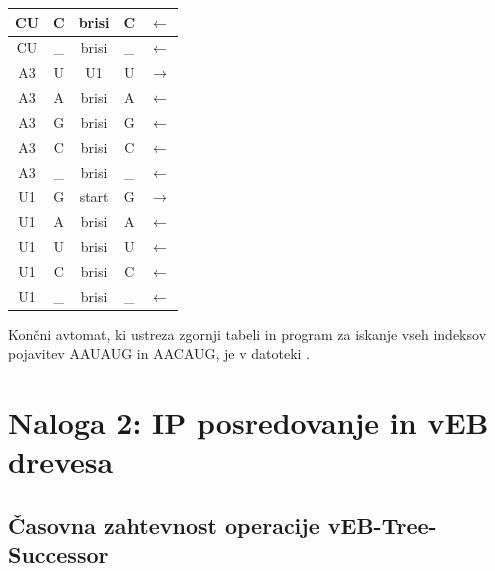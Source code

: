 \documentclass{article}
\begin{document}
\begin{center}
\begin{tabular}{| c | c || c | c | c |}
        CU & C & brisi & C & $\leftarrow$  \\ \hline
        CU & \_ & brisi & \_ & $\leftarrow$  \\ \hline
        A3 & U & U1 & U & $\rightarrow$  \\ \hline
        A3 & A & brisi & A & $\leftarrow$  \\ \hline
        A3 & G & brisi & G & $\leftarrow$  \\ \hline
        A3 & C & brisi & C & $\leftarrow$  \\ \hline
        A3 & \_ & brisi & \_ & $\leftarrow$  \\ \hline
        U1 & G & start & G & $\rightarrow$  \\ \hline
        U1 & A & brisi & A & $\leftarrow$  \\ \hline
        U1 & U & brisi & U & $\leftarrow$  \\ \hline
        U1 & C & brisi & C & $\leftarrow$  \\ \hline
        U1 & \_ & brisi & \_ & $\leftarrow$  \\ \hline
    \end{tabular}
\end{center}

Končni avtomat, ki ustreza zgornji tabeli in
program za iskanje vseh indeksov pojavitev 
{\selectfont AAUAUG} in {\selectfont AACAUG},
je v datoteki .

\pagebreak
\section*{Naloga 2: IP posredovanje in vEB drevesa}
\subsection*{Časovna zahtevnost operacije {\selectfont vEB-Tree-Successor}}
\end{document}

